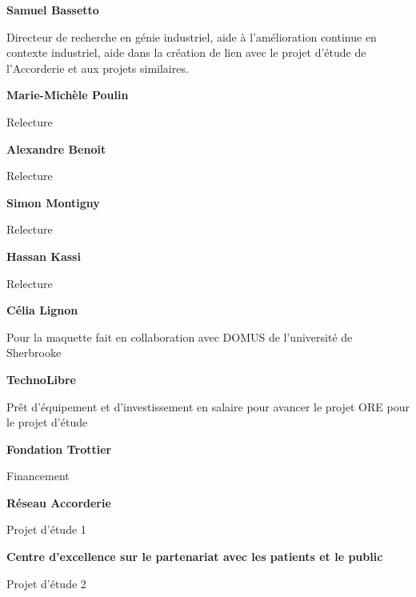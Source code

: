 %

%

\textbf{Samuel Bassetto}

Directeur de recherche en génie industriel, aide à l’amélioration continue en contexte industriel, aide dans la création de lien avec le projet d’étude de l’Accorderie et aux projets similaires.

\textbf{Marie-Michèle Poulin}

Relecture

\textbf{Alexandre Benoit}

Relecture

\textbf{Simon Montigny}

Relecture

\textbf{Hassan Kassi}

Relecture

\textbf{Célia Lignon}

Pour la maquette fait en collaboration avec DOMUS de l’université de Sherbrooke

\textbf{TechnoLibre}

Prêt d’équipement et d'investissement en salaire pour avancer le projet ORE pour le projet d’étude

\textbf{Fondation Trottier}

Financement

\textbf{Réseau Accorderie}

Projet d’étude 1


\textbf{Centre d'excellence sur le partenariat avec les patients et le public}

Projet d’étude 2
